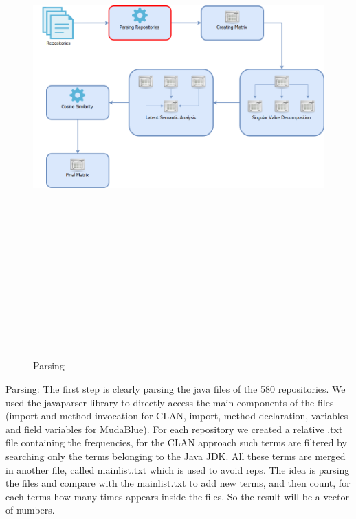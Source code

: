 \begin{figure}[H]
\includegraphics[width=15cm,height=20cm,keepaspectratio]{images/Architecture1.png}
\caption{Parsing}
\end{figure}

Parsing: The first step is clearly parsing the java files of the 580 repositories. We used the javaparser library to directly access
the main components of the files (import and method invocation for CLAN, import, method declaration, variables and field variables for MudaBlue). For each repository we created a relative .txt file containing the frequencies, for the CLAN approach such terms are filtered by searching only the terms belonging to the Java JDK. All these terms are merged in another file, called mainlist.txt which is used to avoid reps. The idea is parsing the files and compare with the mainlist.txt to add new terms, and then count, for each terms how many times appears inside the files. So the result will be a vector of numbers.

